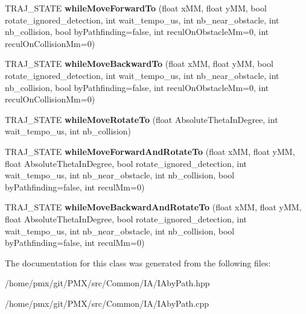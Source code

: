 \begin{DoxyCompactItemize}
T\+R\+A\+J\+\_\+\+S\+T\+A\+TE {\bfseries while\+Move\+Forward\+To} (float x\+MM, float y\+MM, bool rotate\+\_\+ignored\+\_\+detection, int wait\+\_\+tempo\+\_\+us, int nb\+\_\+near\+\_\+obstacle, int nb\+\_\+collision, bool by\+Pathfinding=false, int recul\+On\+Obstacle\+Mm=0, int recul\+On\+Collision\+Mm=0)
\item 
\mbox{\label{classIAbyPath_acc586e1ba62ffb7a21087a5ca4d2f131}} 
T\+R\+A\+J\+\_\+\+S\+T\+A\+TE {\bfseries while\+Move\+Backward\+To} (float x\+MM, float y\+MM, bool rotate\+\_\+ignored\+\_\+detection, int wait\+\_\+tempo\+\_\+us, int nb\+\_\+near\+\_\+obstacle, int nb\+\_\+collision, bool by\+Pathfinding=false, int recul\+On\+Obstacle\+Mm=0, int recul\+On\+Collision\+Mm=0)
\item 
\mbox{\label{classIAbyPath_a42570f6bc87216c2ac5d028ad596fe02}} 
T\+R\+A\+J\+\_\+\+S\+T\+A\+TE {\bfseries while\+Move\+Rotate\+To} (float Absolute\+Theta\+In\+Degree, int wait\+\_\+tempo\+\_\+us, int nb\+\_\+collision)
\item 
\mbox{\label{classIAbyPath_ad4bfc042f043aa802567f05604fb37ad}} 
T\+R\+A\+J\+\_\+\+S\+T\+A\+TE {\bfseries while\+Move\+Forward\+And\+Rotate\+To} (float x\+MM, float y\+MM, float Absolute\+Theta\+In\+Degree, bool rotate\+\_\+ignored\+\_\+detection, int wait\+\_\+tempo\+\_\+us, int nb\+\_\+near\+\_\+obstacle, int nb\+\_\+collision, bool by\+Pathfinding=false, int recul\+Mm=0)
\item 
\mbox{\label{classIAbyPath_a9535c82f137778cc6cd4b159fe3d58ea}} 
T\+R\+A\+J\+\_\+\+S\+T\+A\+TE {\bfseries while\+Move\+Backward\+And\+Rotate\+To} (float x\+MM, float y\+MM, float Absolute\+Theta\+In\+Degree, bool rotate\+\_\+ignored\+\_\+detection, int wait\+\_\+tempo\+\_\+us, int nb\+\_\+near\+\_\+obstacle, int nb\+\_\+collision, bool by\+Pathfinding=false, int recul\+Mm=0)
\end{DoxyCompactItemize}


The documentation for this class was generated from the following files\+:\begin{DoxyCompactItemize}
\item 
/home/pmx/git/\+P\+M\+X/src/\+Common/\+I\+A/I\+Aby\+Path.\+hpp\item 
/home/pmx/git/\+P\+M\+X/src/\+Common/\+I\+A/I\+Aby\+Path.\+cpp\end{DoxyCompactItemize}
